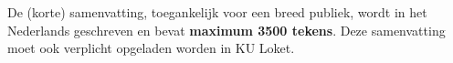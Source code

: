 
De (korte) samenvatting, toegankelijk voor een breed publiek, wordt in het Nederlands geschreven en bevat \textbf{maximum 3500 tekens}. Deze samenvatting moet ook verplicht opgeladen worden in KU Loket.
